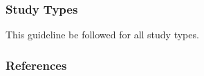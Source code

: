 

\subsubsection{Study Types}

This guideline \should be followed for all study types. 

\subsubsection{References}





